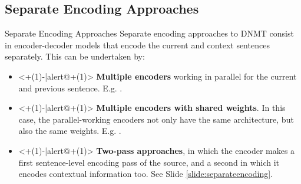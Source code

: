 \subsection{Separate Encoding Approaches}

\begin{frame}{Separate Encoding Approaches}
Separate encoding approaches to DNMT consist in encoder-decoder models that encode the current and context sentences separately. This can be undertaken by:
	\begin{itemize}
		\item<+(1)-|alert@+(1)> \textbf{Multiple encoders} working in parallel for the current and previous sentence. E.g. \cite{wang_exploiting_2017}.
		\item<+(1)-|alert@+(1)> \textbf{Multiple encoders with shared weights}. In this case, the parallel-working encoders not only have the same architecture, but also the same weights. E.g. \cite{voita_context-aware_2018}.
		\item<+(1)-|alert@+(1)> \textbf{Two-pass approaches}, in which the encoder makes a first sentence-level encoding pass of the source, and a second in which it encodes contextual information too. See Slide \ref{slide:separateencoding}.
	\end{itemize}  
\end{frame}

